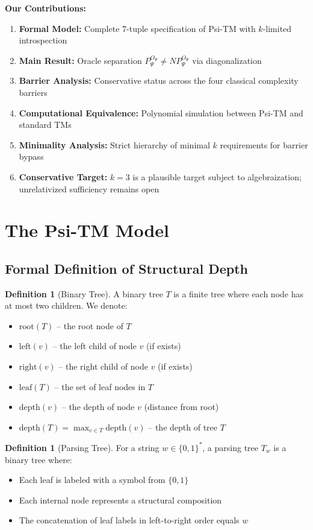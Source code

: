 \documentclass[11pt]{article}
\theoremstyle{definition}
\newtheorem{definition}[theorem]{Definition}
\begin{document}
\textbf{Our Contributions:}
\begin{enumerate}
\item \textbf{Formal Model:} Complete 7-tuple specification of Psi-TM with $k$-limited introspection
\item \textbf{Main Result:} Oracle separation $P^{O_\Psi}_\Psi \neq NP^{O_\Psi}_\Psi$ via diagonalization
\item \textbf{Barrier Analysis:} Conservative status across the four classical complexity barriers
\item \textbf{Computational Equivalence:} Polynomial simulation between Psi-TM and standard TMs
\item \textbf{Minimality Analysis:} Strict hierarchy of minimal $k$ requirements for barrier bypass
\item \textbf{Conservative Target:} $k=3$ is a plausible target subject to algebraization; unrelativized sufficiency remains open
\end{enumerate}

\section{The Psi-TM Model}

\subsection{Formal Definition of Structural Depth}

\begin{definition}[Binary Tree]
A binary tree $T$ is a finite tree where each node has at most two children. We denote:
\begin{itemize}
\item $\text{root}(T)$ -- the root node of $T$
\item $\text{left}(v)$ -- the left child of node $v$ (if exists)
\item $\text{right}(v)$ -- the right child of node $v$ (if exists)
\item $\text{leaf}(T)$ -- the set of leaf nodes in $T$
\item $\text{depth}(v)$ -- the depth of node $v$ (distance from root)
\item $\text{depth}(T) = \max_{v \in T} \text{depth}(v)$ -- the depth of tree $T$
\end{itemize}
\end{definition}

\begin{definition}[Parsing Tree]
For a string $w \in \{0,1\}^*$, a parsing tree $T_w$ is a binary tree where:
\begin{itemize}
\item Each leaf is labeled with a symbol from $\{0,1\}$
\item Each internal node represents a structural composition
\item The concatenation of leaf labels in left-to-right order equals $w$
\end{itemize}
\end{definition}
\end{document}
